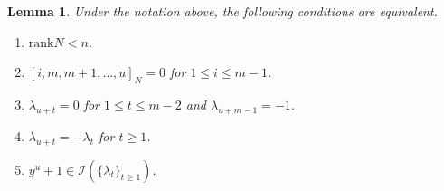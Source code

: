 \documentclass[a4paper,12pt]{article}
\newcommand{\msIII}{\mathscr{I}}
\newcommand{\rank}{\mathrm{rank}}
\newtheorem{lemma}[thm]{Lemma}
\begin{document}
\begin{lemma}
\label{lem:non full rank}
Under the notation above, the following  conditions are equivalent.
\begin{enumerate}
\item
\label{item:rank less than n}
$\rank N<n$.
\item
\label{item:minors vanish}
$[i,m,m+1,\ldots,u]_N=0$ for $1\leq i\leq m-1$.
\item
\label{item:lambda u+1}
$\lambda_{u+t}=0$ for $1\leq t\leq m-2$ and $\lambda_{u+m-1}=-1$.
\item
\label{item:rec u}
$\lambda_{u+t}=-\lambda_t$ for $t\geq 1$.
\item
\label{item:yu}
$y^u+1\in\msIII(\{\lambda_t\}_{t\geq 1})$.
\end{enumerate}
\end{lemma}
%
%
\end{document}
